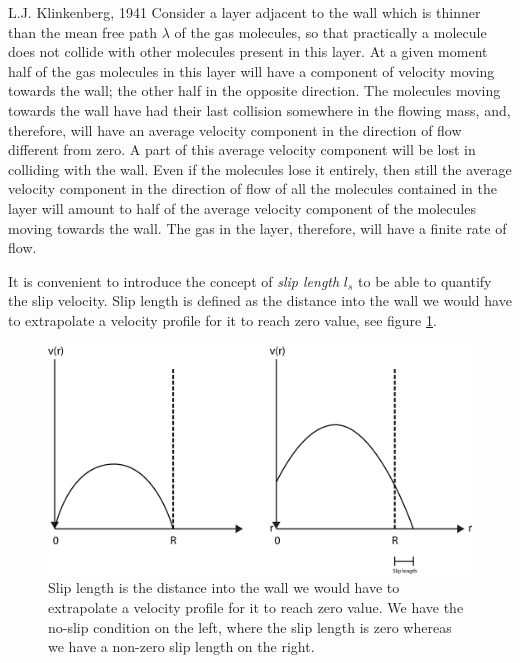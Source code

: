\begin{aquote}{L.J. Klinkenberg, 1941}
Consider a layer adjacent to the wall which is thinner than the mean free path $\lambda$ of the gas molecules, so that practically a molecule does not collide with other molecules present in this layer. At a given moment half of the gas molecules in this layer will have a component of velocity moving towards the wall; the other half in the opposite direction. The molecules moving towards the wall have had their last collision somewhere in the flowing mass, and, therefore, will have an average velocity component in the direction of flow different from zero. A part of this average velocity component will be lost in colliding with the wall. Even if the molecules lose it entirely, then still the average velocity component in the direction of flow of all the molecules contained in the layer will amount to half of the average velocity component of the molecules moving towards the wall. The gas in the layer, therefore, will have a finite rate of flow.
\end{aquote}
It is convenient to introduce the concept of \textit{slip length} $l_s$ to be able to quantify the slip velocity. Slip length is defined as the distance into the wall we would have to extrapolate a velocity profile for it to reach zero value, see figure \ref{fig:slip_length}.
\begin{figure}[h]
\begin{center}
\includegraphics[width=\textwidth, trim=0cm 0cm 0cm 0cm, clip]{DSMC/figures/slip_length.eps}
\end{center}
\caption{Slip length is the distance into the wall we would have to extrapolate a velocity profile for it to reach zero value. We have the no-slip condition on the left, where the slip length is zero whereas we have a non-zero slip length on the right.}
\label{fig:slip_length}
\end{figure}
